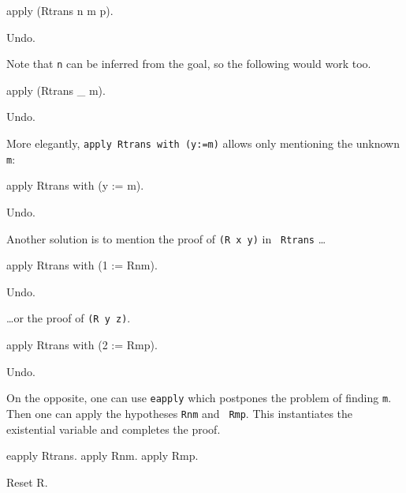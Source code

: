 \begin{coq_example*}
\begin{coq_example}
apply (Rtrans n m p).
\end{coq_example}

\begin{coq_eval}
Undo.
\end{coq_eval}

Note that {\tt n} can be inferred from the goal, so the following would
work too.

\begin{coq_example*}
apply (Rtrans _ m).
\end{coq_example*}
\begin{coq_eval}
Undo.
\end{coq_eval}

More elegantly, {\tt apply Rtrans with (y:=m)} allows only mentioning
the unknown {\tt m}:

\begin{coq_example*}
apply Rtrans with (y := m).
\end{coq_example*}
\begin{coq_eval}
Undo.
\end{coq_eval}

Another solution is to mention the proof of {\tt (R x y)} in {\tt
Rtrans} \ldots

\begin{coq_example}
apply Rtrans with (1 := Rnm).
\end{coq_example}
\begin{coq_eval}
Undo.
\end{coq_eval}

\ldots or the proof of {\tt (R y z)}.

\begin{coq_example}
apply Rtrans with (2 := Rmp).
\end{coq_example}
\begin{coq_eval}
Undo.
\end{coq_eval}

On the opposite, one can use {\tt eapply} which postpones the problem
of finding {\tt m}. Then one can apply the hypotheses {\tt Rnm} and {\tt
Rmp}. This instantiates the existential variable and completes the proof.

\begin{coq_example}
eapply Rtrans.
apply Rnm.
apply Rmp.
\end{coq_example}

\begin{coq_eval}
Reset R.
\end{coq_eval}


\end{coq_example*}
